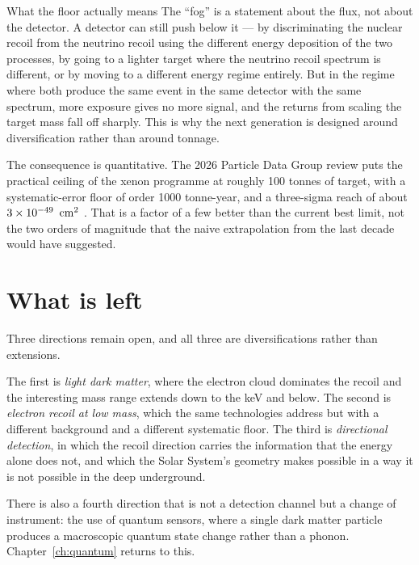 \begin{deeper}{What the floor actually means}
The ``fog'' is a statement about the flux, not about the detector. A
detector can still push below it --- by discriminating the nuclear recoil
from the neutrino recoil using the different energy deposition of the two
processes, by going to a lighter target where the neutrino recoil spectrum
is different, or by moving to a different energy regime entirely. But in the
regime where both produce the same event in the same detector with the same
spectrum, more exposure gives no more signal, and the returns from scaling
the target mass fall off sharply. This is why the next generation is
designed around diversification rather than around tonnage.\end{deeper}

The consequence is quantitative. The 2026 Particle Data Group review puts the
practical ceiling of the xenon programme at roughly 100 tonnes of target,
with a systematic-error floor of order 1000 tonne-year, and a three-sigma
reach of about $3\times 10^{-49}\ \cmtwo$ . That is
a factor of a few better than the current best limit, not the two orders of
magnitude that the naive extrapolation from the last decade would have
suggested.

\section{What is left}Three directions remain open, and all three are
diversifications rather than extensions.

The first is \emph{light dark matter}, where the electron cloud dominates
the recoil and the interesting mass range extends down to the keV and below.
The second is \emph{electron recoil at low mass}, which the same
technologies address but with a different background and a different
systematic floor. The third is \emph{directional detection}, in which the
recoil direction carries the information that the energy alone does not,
and which the Solar System's geometry makes possible in a way it is not
possible in the deep underground.

There is also a fourth direction that is not a detection channel but a
change of instrument: the use of quantum sensors, where a single dark
matter particle produces a macroscopic quantum state change rather than a
phonon. Chapter~\ref{ch:quantum} returns to this.


